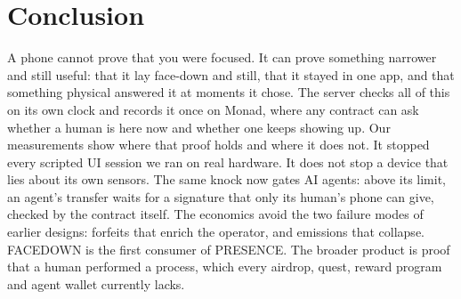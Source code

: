 \documentclass[10pt]{article}
\begin{document}
\section{Conclusion}
A phone cannot prove that you were focused. It can prove something narrower and still useful: that it lay face-down and
still, that it stayed in one app, and that something physical answered it at moments it chose. The server checks all of
this on its own clock and records it once on Monad, where any contract can ask whether a human is here now and whether
one keeps showing up. Our measurements show where that proof holds and where it does not. It stopped every scripted UI
session we ran on real hardware. It does not stop a device that lies about its own sensors. The same knock now gates AI
agents: above its limit, an agent's transfer waits for a signature that only its human's phone can give, checked by the
contract itself. The economics avoid the two failure modes of earlier designs: forfeits that enrich the operator, and
emissions that collapse. FACEDOWN is the first consumer of PRESENCE. The broader product is proof that a human performed a
process, which every airdrop, quest, reward program and agent wallet currently lacks.
\end{document}
